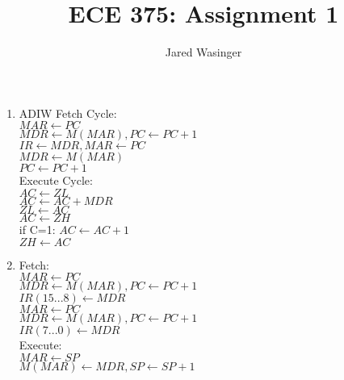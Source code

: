 \documentclass{article}
\begin{document}
  \title{ECE 375: Assignment 1}
  \author{Jared Wasinger}

  \maketitle

  \begin{enumerate}
		\item ADIW
			Fetch Cycle:\\
					$MAR \leftarrow PC$\\
					$MDR \leftarrow M(MAR), PC \leftarrow PC + 1$\\
					$IR \leftarrow MDR, MAR \leftarrow PC$\\
					$MDR \leftarrow M(MAR)$\\
					$PC \leftarrow PC + 1$\\
			Execute Cycle:\\
					$AC \leftarrow ZL$\\
					$AC \leftarrow AC + MDR$\\
					$ZL \leftarrow AC$\\
					$AC \leftarrow ZH$\\
					if C=1: $AC \leftarrow AC + 1$\\
					$ZH \leftarrow AC$\\
		\item
			Fetch:\\
				$MAR \leftarrow PC$\\
				$MDR \leftarrow M(MAR), PC \leftarrow PC + 1$\\
				$IR(15...8) \leftarrow MDR$\\
				$MAR \leftarrow PC$\\
				$MDR \leftarrow M(MAR), PC \leftarrow PC + 1$\\
			  $IR(7...0) \leftarrow MDR$\\
			Execute:\\
				$MAR \leftarrow SP$\\
				$M(MAR) \leftarrow MDR, SP \leftarrow SP + 1$\\
  \end{enumerate}
\end{document}
